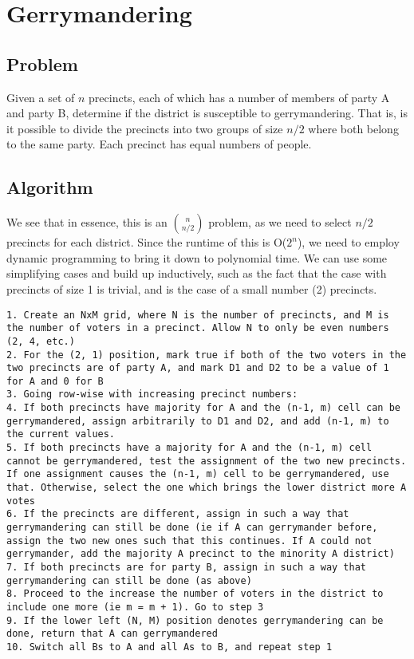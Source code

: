 \documentclass[titlepage]{article}
\begin{document}
\section{Gerrymandering}
\subsection{Problem}
Given a set of $n$ precincts, each of which has a number of members of party A and party B, determine if the district is susceptible to gerrymandering.
That is, is it possible to divide the precincts into two groups of size $n/2$ where both belong to the same party. Each precinct has equal numbers of
people.
\subsection{Algorithm}
We see that in essence, this is an $n \choose {n/2}$ problem, as we need to select $n/2$ precincts for each district. Since the runtime of this is
O($2^n$), we need to employ dynamic programming to bring it down to polynomial time. We can use some simplifying cases and build up inductively,
such as the fact that the case with precincts of size 1 is trivial, and is the case of a small number (2) precincts.
\begin{lstlisting}
1. Create an NxM grid, where N is the number of precincts, and M is the number of voters in a precinct. Allow N to only be even numbers (2, 4, etc.)
2. For the (2, 1) position, mark true if both of the two voters in the two precincts are of party A, and mark D1 and D2 to be a value of 1 for A and 0 for B
3. Going row-wise with increasing precinct numbers:
4. If both precincts have majority for A and the (n-1, m) cell can be gerrymandered, assign arbitrarily to D1 and D2, and add (n-1, m) to the current values.
5. If both precincts have a majority for A and the (n-1, m) cell cannot be gerrymandered, test the assignment of the two new precincts. If one assignment causes the (n-1, m) cell to be gerrymandered, use that. Otherwise, select the one which brings the lower district more A votes
6. If the precincts are different, assign in such a way that gerrymandering can still be done (ie if A can gerrymander before, assign the two new ones such that this continues. If A could not gerrymander, add the majority A precinct to the minority A district)
7. If both precincts are for party B, assign in such a way that gerrymandering can still be done (as above)
8. Proceed to the increase the number of voters in the district to include one more (ie m = m + 1). Go to step 3
9. If the lower left (N, M) position denotes gerrymandering can be done, return that A can gerrymandered
10. Switch all Bs to A and all As to B, and repeat step 1
\end{lstlisting}
\end{document}

